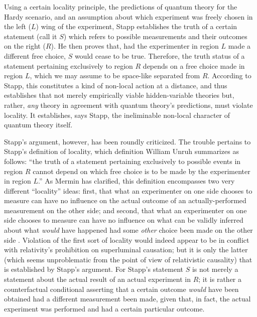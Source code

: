\documentclass[aps,prc,onecolumn,12pt]{revtex4-2}
\begin{document}
Using a certain locality principle, the predictions of quantum
theory for the Hardy
scenario, and an assumption about which experiment was freely chosen
in the left ($L$) wing of the experiment, Stapp establishes the truth
of a certain statement (call it $S$) which refers to possible
measurements and their outcomes on the right ($R$).
He then proves that, had the
experimenter in region $L$ made a different free choice, $S$ would
cease to be true.  Therefore, the truth status of a statement pertaining
exclusively to region $R$ depends on a free choice made in region $L$,
which we may assume to be space-like separated from $R$.  According to
Stapp, this constitutes a kind of non-local action at a distance, and
thus establishes that not merely empirically viable hidden-variable
theories but, rather, \emph{any} theory in agreement with quantum
theory's
predictions, must violate locality.  It establishes, says Stapp, the
ineliminable non-local character of quantum theory itself.

Stapp's argument, however, has been roundly criticized.  The trouble
pertains to Stapp's definition of locality, which definition William
Unruh summarizes as follows:  ``the
truth of a statement pertaining exclusively to possible events in
region $R$ cannot depend on which free choice is to be made by the
experimenter in region $L$.''  \cite{unruh}
As Mermin has clarified, this definition encompasses
two very different ``locality'' ideas:  first, that what
an experimenter on one side chooses to measure can have no influence
on the actual outcome of an actually-performed measurement on the
other side; and second, that what an experimenter on one side chooses to
measure can have no influence on what can be validly inferred about
what \emph{would} have happened had some \emph{other} choice been made
on the other side \cite{mermin}.  Violation of the first sort of
locality would indeed appear to be in
conflict with relativity's prohibition on superluminal causation; but
it is only the latter (which seems unproblematic from the point of
view of relativistic causality) that is established by Stapp's
argument.   For Stapp's statement $S$ is not merely a statement about the
actual result of an actual experiment in $R$; it is rather a
counterfactual conditional asserting that a certain outcome
\emph{would} have been obtained had a different measurement been made,
given that, in fact, the actual experiment was performed and had a
certain particular outcome.
\end{document}
